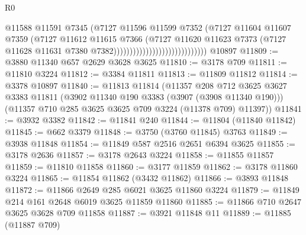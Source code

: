 \begin{lexlean}{R0}
\begin{coremodule}
                                                    @11588
                                                    @11591
                                                    @7345
                                                    (@7127
                                                      @11596
                                                      @11599
                                                      @7352
                                                      (@7127
                                                        @11604
                                                        @11607
                                                        @7359
                                                        (@7127
                                                          @11612
                                                          @11615
                                                          @7366
                                                          (@7127
                                                            @11620
                                                            @11623
                                                            @7373
                                                            (@7127
                                                              @11628
                                                              @11631
                                                              @7380
                                                              @7382)))))))))))))))))))))))))))))
    @10897
@11809 := @3880 @11340 @657 @2629 @3628 @3625
@11810 := @3178 @709
@11811 := @11810 @3224
@11812 := @3384 @11811
@11813 := @11809 @11812
@11814 := @3378 @10897
@11840 := @11813
    @11814
    (@11357
      @208
      @712
      @3625
      @3627
      @3383
      @11811
      (@3902 @11340 @190 @3383 (@3907 (@3908 @11340 @190)))
      (@11357 @710 @285 @3625 @3625 @709 @3224 (@11378 @709) @11397))
@11841 := @3932 @3382
@11842 := @11841 @240
@11844 := @11804 (@11840 @11842)
@11845 := @662 @3379
@11848 := @3750 (@3760 @11845) @3763
@11849 := @3938 @11848
@11854 := @11849 @587 @2516 @2651 @6394 @3625
@11855 := @3178 @2636
@11857 := @3178 @2643 @3224
@11858 := @11855 @11857
@11859 := @11810 @11858
@11860 := @3177 @11859
@11862 := @3178 @11860 @3224
@11865 := @11854 @11862 (@3432 @11862)
@11866 := @3893 @11848
@11872 := @11866 @2649 @285 @6021 @3625 @11860 @3224
@11879 := @11849 @214 @161 @2648 @6019 @3625 @11859 @11860
@11885 := @11866 @710 @2647 @3625 @3628 @709 @11858
@11887 := @3921 @11848 @11
@11889 := @11885 (@11887 @709)

\end{coremodule}
\end{lexlean}
